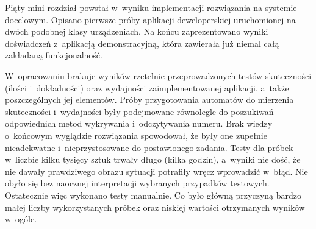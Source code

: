 Piąty mini-rozdział powstał w~wyniku implementacji rozwiązania na 
systemie docelowym. Opisano pierwsze próby aplikacji deweloperskiej
uruchomionej na dwóch podobnej klasy urządzeniach. Na końcu
zaprezentowano wyniki doświadczeń z~aplikacją demonstracyjną,
która zawierała już niemal całą zakładaną funkcjonalność.

W~opracowaniu brakuje wyników rzetelnie przeprowadzonych testów
skuteczności (ilości i~dokładności) oraz wydajności zaimplementowanej 
aplikacji, a~także poszczególnych jej elementów. Próby 
przygotowania automatów do mierzenia skuteczności i~wydajności
były podejmowane równolegle do poszukiwań odpowiednich metod
wykrywania i~odczytywania numeru. Brak wiedzy o~końcowym wyglądzie
rozwiązania spowodował, że były one zupełnie nieadekwatne i~nieprzystosowane
do postawionego zadania. Testy dla próbek w~liczbie kilku tysięcy sztuk
trwały długo (kilka godzin), a~wyniki nie dość, że nie dawały prawdziwego
obrazu sytuacji potrafiły wręcz wprowadzić w~błąd.
Nie obyło się bez naocznej interpretacji wybranych przypadków testowych. 
Ostatecznie więc wykonano testy manualnie. Co było główną przyczyną
bardzo małej liczby wykorzystanych próbek oraz niskiej
wartości otrzymanych wyników w~ogóle.

